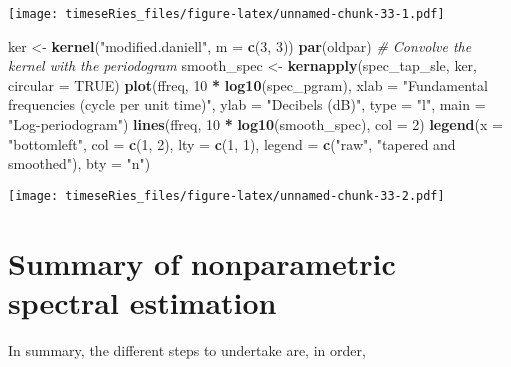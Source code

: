\documentclass[]{book}
\newenvironment{Shaded}{\begin{snugshade}}{\end{snugshade}}
\newcommand{\KeywordTok}[1]{\textcolor[rgb]{0.13,0.29,0.53}{\textbf{#1}}}
\newcommand{\DataTypeTok}[1]{\textcolor[rgb]{0.13,0.29,0.53}{#1}}
\newcommand{\DecValTok}[1]{\textcolor[rgb]{0.00,0.00,0.81}{#1}}
\newcommand{\StringTok}[1]{\textcolor[rgb]{0.31,0.60,0.02}{#1}}
\newcommand{\CommentTok}[1]{\textcolor[rgb]{0.56,0.35,0.01}{\textit{#1}}}
\newcommand{\OtherTok}[1]{\textcolor[rgb]{0.56,0.35,0.01}{#1}}
\newcommand{\OperatorTok}[1]{\textcolor[rgb]{0.81,0.36,0.00}{\textbf{#1}}}
\newcommand{\NormalTok}[1]{#1}
\begin{document}
\texttt{[image: timeseRies\_files/figure-latex/unnamed-chunk-33-1.pdf]}

\begin{Shaded}
\begin{Highlighting}[]
\NormalTok{ker <-}\StringTok{ }\KeywordTok{kernel}\NormalTok{(}\StringTok{"modified.daniell"}\NormalTok{, }\DataTypeTok{m =} \KeywordTok{c}\NormalTok{(}\DecValTok{3}\NormalTok{, }\DecValTok{3}\NormalTok{))}
\KeywordTok{par}\NormalTok{(oldpar)}
\CommentTok{# Convolve the kernel with the periodogram}
\NormalTok{smooth_spec <-}\StringTok{ }\KeywordTok{kernapply}\NormalTok{(spec_tap_sle, ker, }\DataTypeTok{circular =} \OtherTok{TRUE}\NormalTok{)}
\KeywordTok{plot}\NormalTok{(ffreq, }\DecValTok{10} \OperatorTok{*}\StringTok{ }\KeywordTok{log10}\NormalTok{(spec_pgram), }\DataTypeTok{xlab =} \StringTok{"Fundamental frequencies (cycle per unit time)"}\NormalTok{, }
    \DataTypeTok{ylab =} \StringTok{"Decibels (dB)"}\NormalTok{, }\DataTypeTok{type =} \StringTok{"l"}\NormalTok{, }\DataTypeTok{main =} \StringTok{"Log-periodogram"}\NormalTok{)}
\KeywordTok{lines}\NormalTok{(ffreq, }\DecValTok{10} \OperatorTok{*}\StringTok{ }\KeywordTok{log10}\NormalTok{(smooth_spec), }\DataTypeTok{col =} \DecValTok{2}\NormalTok{)}
\KeywordTok{legend}\NormalTok{(}\DataTypeTok{x =} \StringTok{"bottomleft"}\NormalTok{, }\DataTypeTok{col =} \KeywordTok{c}\NormalTok{(}\DecValTok{1}\NormalTok{, }\DecValTok{2}\NormalTok{), }\DataTypeTok{lty =} \KeywordTok{c}\NormalTok{(}\DecValTok{1}\NormalTok{, }\DecValTok{1}\NormalTok{), }\DataTypeTok{legend =} \KeywordTok{c}\NormalTok{(}\StringTok{"raw"}\NormalTok{, }\StringTok{"tapered and smoothed"}\NormalTok{), }
    \DataTypeTok{bty =} \StringTok{"n"}\NormalTok{)}
\end{Highlighting}
\end{Shaded}

\texttt{[image: timeseRies\_files/figure-latex/unnamed-chunk-33-2.pdf]}

\section{Summary of nonparametric spectral
estimation}\label{summary-of-nonparametric-spectral-estimation}

In summary, the different steps to undertake are, in order,
\end{document}
